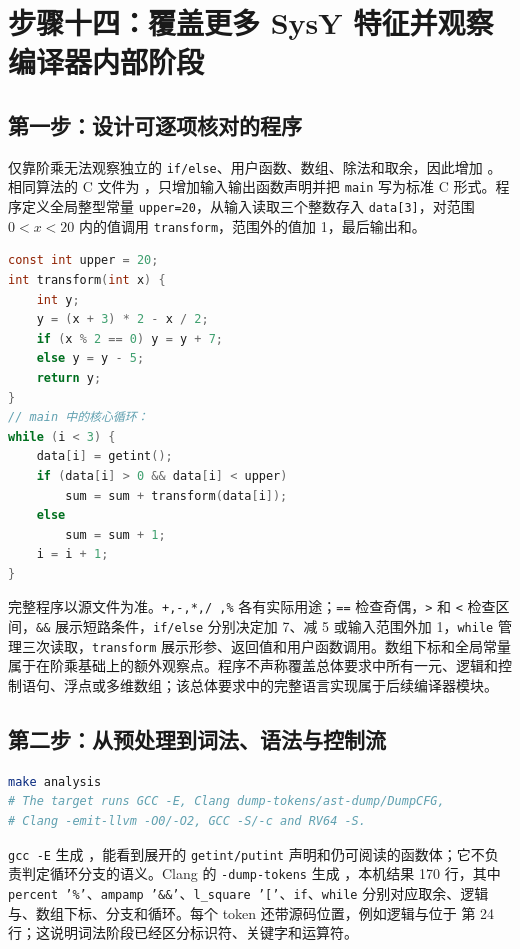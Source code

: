 \documentclass[UTF8,a4paper,12pt]{ctexart}
\begin{document}
\section{步骤十四：覆盖更多 SysY 特征并观察编译器内部阶段}
\label{sec:features}

\subsection{第一步：设计可逐项核对的程序}

仅靠阶乘无法观察独立的 \texttt{if/else}、用户函数、数组、除法和取余，因此增加 。相同算法的 C 文件为 ，只增加输入输出函数声明并把 \texttt{main} 写为标准 C 形式。程序定义全局整型常量 \texttt{upper=20}，从输入读取三个整数存入 \texttt{data[3]}，对范围 $0<x<20$ 内的值调用 \texttt{transform}，范围外的值加 1，最后输出和。

\begin{lstlisting}[language=C]
const int upper = 20;
int transform(int x) {
    int y;
    y = (x + 3) * 2 - x / 2;
    if (x % 2 == 0) y = y + 7;
    else y = y - 5;
    return y;
}
// main 中的核心循环：
while (i < 3) {
    data[i] = getint();
    if (data[i] > 0 && data[i] < upper)
        sum = sum + transform(data[i]);
    else
        sum = sum + 1;
    i = i + 1;
}
\end{lstlisting}

完整程序以源文件为准。\texttt{+,-,*,/ ,\%} 各有实际用途；\texttt{==} 检查奇偶，\texttt{>} 和 \texttt{<} 检查区间，\texttt{\&\&} 展示短路条件，\texttt{if/else} 分别决定加 7、减 5 或输入范围外加 1，\texttt{while} 管理三次读取，\texttt{transform} 展示形参、返回值和用户函数调用。数组下标和全局常量属于在阶乘基础上的额外观察点。程序不声称覆盖总体要求中所有一元、逻辑和控制语句、浮点或多维数组；该总体要求中的完整语言实现属于后续编译器模块。

\subsection{第二步：从预处理到词法、语法与控制流}

\begin{lstlisting}[language=bash]
make analysis
# The target runs GCC -E, Clang dump-tokens/ast-dump/DumpCFG,
# Clang -emit-llvm -O0/-O2, GCC -S/-c and RV64 -S.
\end{lstlisting}

\texttt{gcc -E} 生成 ，能看到展开的 \texttt{getint/putint} 声明和仍可阅读的函数体；它不负责判定循环分支的语义。Clang 的 \texttt{-dump-tokens} 生成 ，本机结果 170 行，其中 \texttt{percent '\%'}、\texttt{ampamp '\&\&'}、\texttt{l\_square '['}、\texttt{if}、\texttt{while} 分别对应取余、逻辑与、数组下标、分支和循环。每个 token 还带源码位置，例如逻辑与位于  第 24 行；这说明词法阶段已经区分标识符、关键字和运算符。
\end{document}
